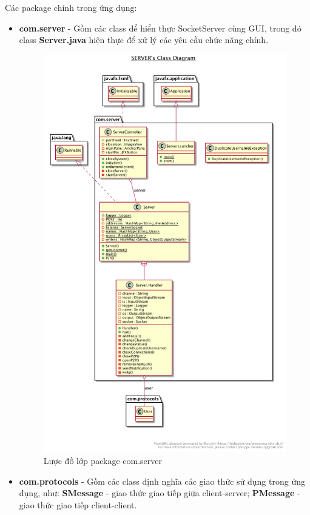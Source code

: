 \documentclass[a4paper]{article}
\begin{document}
Các package chính trong ứng dụng:
\begin{itemize}
	\item {\bf com.server} - Gồm các class để hiển thực SocketServer cùng GUI, trong đó class {\bf Server.java} hiện thực để xử lý các yêu cầu chức năng chính.
	\begin{figure}[h!]
		\centering
		\includegraphics[width=11cm]{plantuml-server}
		\caption{Lược đồ lớp package com.server}
	\end{figure}
	\newpage
	\item {\bf com.protocols} - Gồm các class định nghĩa các giao thức sử dụng trong ứng dụng, như: {\bf SMessage} - giao thức giao tiếp giữa client-server; {\bf PMessage} - giao thức giao tiếp client-client.
	\begin{figure}[h!]
		\centering

\end{figure}
\end{itemize}
\end{document}
